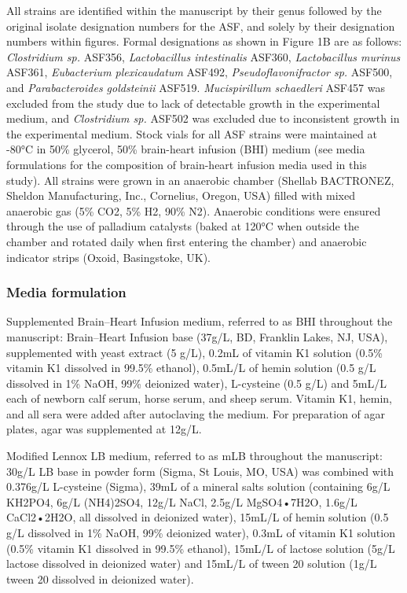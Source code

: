 \documentclass[11pt,twocolumn,notitlepage,openany,twoside]{book}
\begin{document}
\begin{refsection}
All strains are identified within the manuscript by their genus followed by the original isolate designation numbers for the ASF, and solely by their designation numbers within figures. Formal designations as shown in Figure 1B are as follows: \textit{Clostridium sp.} ASF356, \textit{Lactobacillus intestinalis} ASF360, \textit{Lactobacillus murinus} ASF361, \textit{Eubacterium plexicaudatum} ASF492, \textit{Pseudoflavonifractor sp.} ASF500, and \textit{Parabacteroides goldsteinii} ASF519. \textit{Mucispirillum schaedleri} ASF457 was excluded from the study due to lack of detectable growth in the experimental medium, and \textit{Clostridium sp.} ASF502 was excluded due to inconsistent growth in the experimental medium. Stock vials for all ASF strains were maintained at -80°C in 50\% glycerol, 50\% brain-heart infusion (BHI) medium (see media formulations for the composition of brain-heart infusion media used in this study). All strains were grown in an anaerobic chamber (Shellab BACTRONEZ, Sheldon Manufacturing, Inc., Cornelius, Oregon, USA) filled with mixed anaerobic gas (5\% CO2, 5\% H2, 90\% N2). Anaerobic conditions were ensured through the use of palladium catalysts (baked at 120°C when outside the chamber and rotated daily when first entering the chamber) and anaerobic indicator strips (Oxoid, Basingstoke, UK).

\subsubsection{Media formulation}

Supplemented Brain–Heart Infusion medium, referred to as BHI throughout the manuscript: Brain–Heart Infusion base (37g/L, BD, Franklin Lakes, NJ, USA), supplemented with yeast extract (5 g/L), 0.2mL of vitamin K1 solution (0.5\% vitamin K1 dissolved in 99.5\% ethanol), 0.5mL/L of hemin solution (0.5 g/L dissolved in 1\% NaOH, 99\% deionized water), L-cysteine (0.5 g/L) and 5mL/L each of newborn calf serum, horse serum, and sheep serum. Vitamin K1, hemin, and all sera were added after autoclaving the medium. For preparation of agar plates, agar was supplemented at 12g/L.

Modified Lennox LB medium, referred to as mLB throughout the manuscript:  30g/L LB base in powder form (Sigma, St Louis, MO, USA) was combined with 0.376g/L L-cysteine (Sigma), 39mL of a mineral salts solution (containing 6g/L KH2PO4, 6g/L (NH4)2SO4, 12g/L NaCl, 2.5g/L MgSO4•7H2O, 1.6g/L CaCl2•2H2O, all dissolved in deionized water), 15mL/L of hemin solution (0.5 g/L dissolved in 1\% NaOH, 99\% deionized water), 0.3mL of vitamin K1 solution (0.5\% vitamin K1 dissolved in 99.5\% ethanol), 15mL/L of lactose solution (5g/L lactose dissolved in deionized water) and 15mL/L of tween 20 solution (1g/L tween 20 dissolved in deionized water).


\end{refsection}
\end{document}
